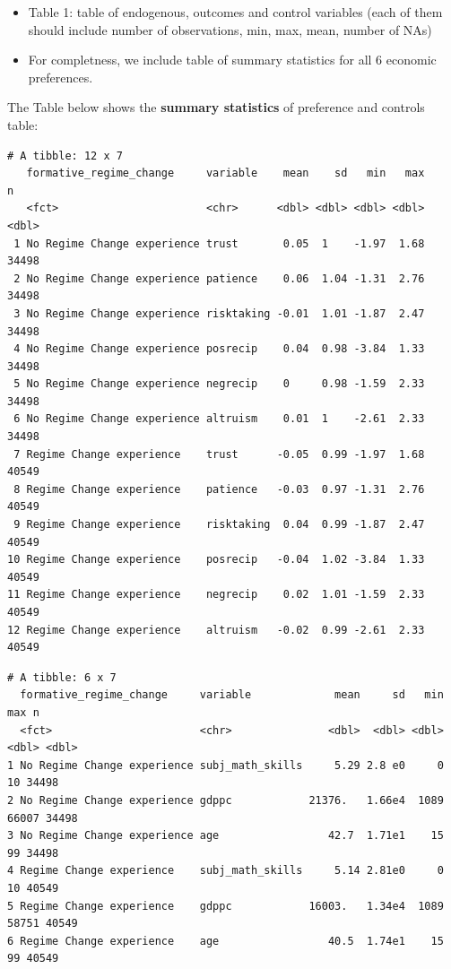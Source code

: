 \documentclass[
  letterpaper,
  DIV=11,
  numbers=noendperiod]{scrartcl}
\providecommand{\tightlist}{%
  \setlength{\itemsep}{0pt}\setlength{\parskip}{0pt}}\usepackage{longtable,booktabs,array}
\begin{document}
\begin{itemize}
\tightlist
\item
  Table 1: table of endogenous, outcomes and control variables (each of
  them should include number of observations, min, max, mean, number of
  NAs)
\item
  For completness, we include table of summary statistics for all 6
  economic preferences.
\end{itemize}

The Table below shows the \textbf{summary statistics} of preference and
controls table:

\begin{verbatim}
# A tibble: 12 x 7
   formative_regime_change     variable    mean    sd   min   max     n
   <fct>                       <chr>      <dbl> <dbl> <dbl> <dbl> <dbl>
 1 No Regime Change experience trust       0.05  1    -1.97  1.68 34498
 2 No Regime Change experience patience    0.06  1.04 -1.31  2.76 34498
 3 No Regime Change experience risktaking -0.01  1.01 -1.87  2.47 34498
 4 No Regime Change experience posrecip    0.04  0.98 -3.84  1.33 34498
 5 No Regime Change experience negrecip    0     0.98 -1.59  2.33 34498
 6 No Regime Change experience altruism    0.01  1    -2.61  2.33 34498
 7 Regime Change experience    trust      -0.05  0.99 -1.97  1.68 40549
 8 Regime Change experience    patience   -0.03  0.97 -1.31  2.76 40549
 9 Regime Change experience    risktaking  0.04  0.99 -1.87  2.47 40549
10 Regime Change experience    posrecip   -0.04  1.02 -3.84  1.33 40549
11 Regime Change experience    negrecip    0.02  1.01 -1.59  2.33 40549
12 Regime Change experience    altruism   -0.02  0.99 -2.61  2.33 40549
\end{verbatim}

\begin{verbatim}
# A tibble: 6 x 7
  formative_regime_change     variable             mean     sd   min   max n    
  <fct>                       <chr>               <dbl>  <dbl> <dbl> <dbl> <dbl>
1 No Regime Change experience subj_math_skills     5.29 2.8 e0     0    10 34498
2 No Regime Change experience gdppc            21376.   1.66e4  1089 66007 34498
3 No Regime Change experience age                 42.7  1.71e1    15    99 34498
4 Regime Change experience    subj_math_skills     5.14 2.81e0     0    10 40549
5 Regime Change experience    gdppc            16003.   1.34e4  1089 58751 40549
6 Regime Change experience    age                 40.5  1.74e1    15    99 40549
\end{verbatim}
\end{document}
